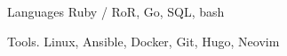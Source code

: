 
\begin{cvskills}


	\cvskill
	{Languages} %
	{Ruby / RoR, Go, SQL, bash} %

	\cvskill
	{Tools\hphantom{25}\color{white}.\hphantom{25}} %
	{Linux, Ansible, Docker, Git, Hugo, Neovim} %

\end{cvskills}
